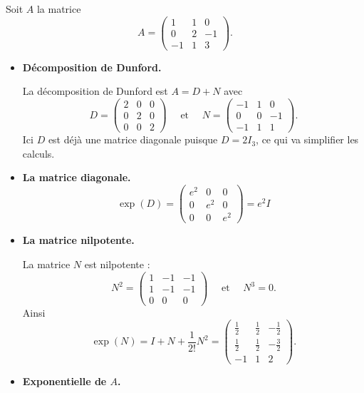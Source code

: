 \documentclass[12pt, class=report,crop=false]{standalone}
\begin{document}
\begin{exemple}
Soit $A$ la matrice 
$$A = \begin{pmatrix}
1 & 1 & 0 \\
0 & 2 & -1 \\
-1 & 1 & 3
\end{pmatrix}.$$


\begin{itemize}
  \item \textbf{Décomposition de Dunford.}
  
La décomposition de Dunford est $A = D + N$ avec 
$$D  = \begin{pmatrix}
2 & 0 & 0 \\
0 & 2 & 0 \\
0 & 0 & 2
\end{pmatrix}
\quad \text{ et } \quad 
N = \begin{pmatrix}
-1 & 1 & 0 \\
0 & 0 & -1 \\
-1 & 1 & 1
\end{pmatrix}.$$
Ici $D$ est déjà une matrice diagonale puisque $D=2I_3$,  ce qui va simplifier les calculs.

\item \textbf{La matrice diagonale.}
$$\exp(D) = 
\begin{pmatrix}
e^2 & 0 & 0 \\
0 & e^2 & 0 \\
0 & 0 & e^2
\end{pmatrix} = e^2 I$$

\item \textbf{La matrice nilpotente.}

La matrice $N$ est nilpotente :
$$N^2 = 
\begin{pmatrix}
1 & -1 & -1 \\
1 & -1 & -1 \\
0 & 0 & 0
\end{pmatrix}
\quad \text{ et } \quad N^3 = 0.$$
Ainsi 
$$\exp(N) = I + N + \frac{1}{2!}N^2 = 
\begin{pmatrix}
\frac{1}{2} & \frac{1}{2} & -\frac{1}{2} \\
\frac{1}{2} & \frac{1}{2} & -\frac{3}{2} \\
-1 & 1 & 2
\end{pmatrix}.
$$

\item \textbf{Exponentielle de $A$.}



\end{itemize}
\end{exemple}
\end{document}
